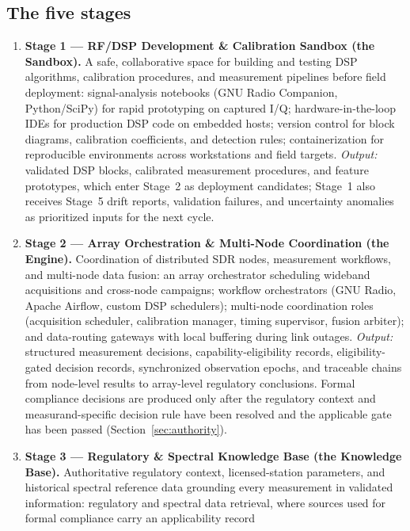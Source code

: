 \documentclass[11pt,a4paper]{article}
\begin{document}
\subsection{The five stages}
\label{sec:stages}

\begin{enumerate}
  \item \textbf{Stage 1 --- RF/DSP Development \& Calibration Sandbox (the Sandbox).} A safe,
    collaborative space for building and testing DSP algorithms, calibration procedures, and
    measurement pipelines before field deployment: signal-analysis notebooks (GNU Radio
    Companion, Python/SciPy) for rapid prototyping on captured I/Q; hardware-in-the-loop IDEs
    for production DSP code on embedded hosts; version control for block diagrams, calibration
    coefficients, and detection rules; containerization for reproducible environments across
    workstations and field targets. \emph{Output:} validated DSP blocks, calibrated measurement
    procedures, and feature prototypes, which enter Stage~2 as deployment candidates; Stage~1
    also receives Stage~5 drift reports, validation failures, and uncertainty anomalies as
    prioritized inputs for the next cycle.
  \item \textbf{Stage 2 --- Array Orchestration \& Multi-Node Coordination (the Engine).}
    Coordination of distributed SDR nodes, measurement workflows, and multi-node data fusion: an
    array orchestrator scheduling wideband acquisitions and cross-node campaigns; workflow
    orchestrators (GNU Radio, Apache Airflow, custom DSP schedulers); multi-node coordination
    roles (acquisition scheduler, calibration manager, timing supervisor, fusion arbiter); and
    data-routing gateways with local buffering during link outages. \emph{Output:} structured
    measurement decisions, capability-eligibility records, eligibility-gated decision records,
    synchronized observation epochs, and traceable chains from node-level results to array-level
    regulatory conclusions. Formal compliance decisions are produced only after the regulatory
    context and measurand-specific decision rule have been resolved and the applicable gate has
    been passed (Section~\ref{sec:authority}).
  \item \textbf{Stage 3 --- Regulatory \& Spectral Knowledge Base (the Knowledge Base).}
    Authoritative regulatory context, licensed-station parameters, and historical spectral
    reference data grounding every measurement in validated information: regulatory and spectral
    data retrieval, where sources used for formal compliance carry an applicability record

\end{enumerate}
\end{document}
